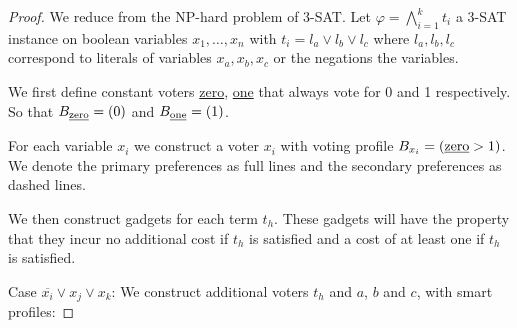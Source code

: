 \documentclass[11pt,a4paper, titlepage]{article}
\theoremstyle{definition}
\begin{document}
\begin{proof}
    We reduce from the NP-hard problem of \textsc{3-SAT}. Let $\varphi = \bigwedge_{i = 1}^k t_i $ a \textsc{3-SAT} instance on boolean variables $x_1, \ldots, x_n$ with $t_i = l_a \lor l_b \lor l_c $ where $l_a, l_b, l_c$ correspond to literals of variables $x_a, x_b, x_c$ or the negations the variables.
    
    We first define constant voters \underline{zero}, \underline{one} that always vote for 0 and 1 respectively. So that $B_{\text{\underline{zero}}} = (0)$ and $B_{\text{\underline{one}}} = (1)$. 

\begin{figure}[h]
    \centering
{}
\end{figure}

For each variable $x_i$ we construct a voter $x_i$ with voting profile $B_{x_i} = (  \text{\underline{zero}} > 1) $. We denote the primary preferences as full lines and the secondary preferences as dashed lines.

\begin{figure}[h]
    \centering
{}
\end{figure}

We then construct gadgets for each term $t_h$. These gadgets will have the property that they incur no additional cost if $t_h$ is satisfied and a cost of at least one if $t_h$ is satisfied.

Case $\overline{x_i} \lor x_j \lor x_k$: We construct additional voters $t_h$ and $a$, $b$ and $c$, with smart profiles:


\end{proof}
\end{document}
